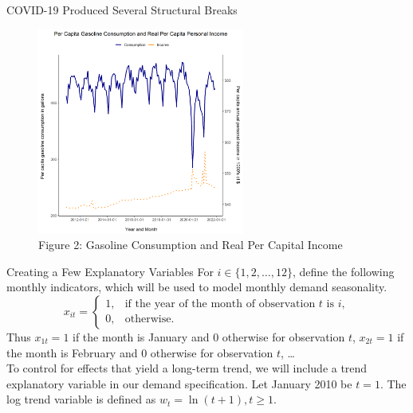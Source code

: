 \documentclass[pdf]{beamer}
\theoremstyle{remark}
\theoremstyle{definition}
\begin{document}
\begin{frame}[t]{COVID-19 Produced Several Structural Breaks}
\begin{figure}[htbp]
  \captionsetup{justification=centering}
  \includegraphics[height=6.8cm, trim=0.0cm 0.0cm 0.0cm 0.0cm width=6.8cm]{../BUSA_603_Gas_Demand/Data_621_A1/a1_q1b.png}
  \caption{Figure {\color{franklinblue} 2}: Gasoline Consumption and Real Per Capital Income}
\end{figure}
\end{frame}

\begin{frame}[t]{Creating a Few Explanatory Variables}
 For  $i \in \{1,2,\ldots, 12\}$, define the following monthly indicators, which will be used to model monthly demand seasonality.
    \[
    x_{it}= 
        \begin{cases}
    1,& \text{if the year of the month of observation } t \text{ is } i, \\
    0,              & \text{otherwise.}
\end{cases}
    \]
  Thus $x_{1t} = 1 $ if the month is January and 0 otherwise for observation $t$, $x_{2t} = 1 $ if the month is February and 0 otherwise for observation $t$, \ldots  \\
\vspace{1.5ex}
  To control for effects that yield a long-term trend, we will include a trend explanatory variable in our demand specification.  Let January 2010 be $t=1$.  The log trend variable is defined as $w_t = \ln(t+1), t \geq 1$.

\end{frame}
\end{document}

